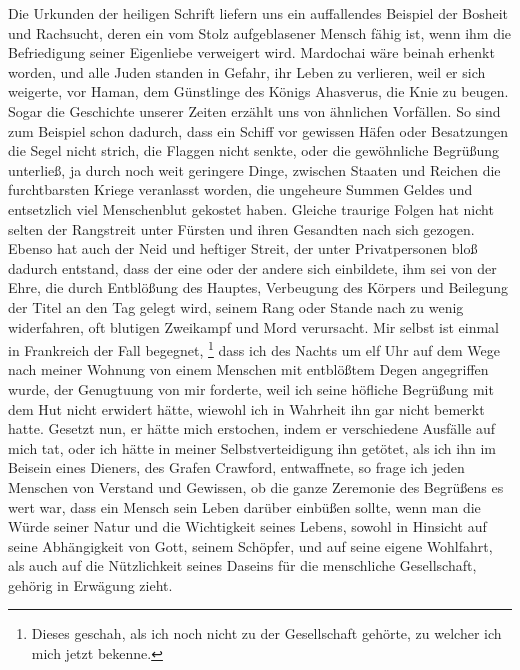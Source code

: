 Die Urkunden der heiligen Schrift liefern uns ein auffallendes Beispiel der
Bosheit und Rachsucht, deren ein vom Stolz aufgeblasener Mensch fähig ist, wenn
ihm die Befriedigung seiner Eigenliebe verweigert wird.
Mardochai wäre beinah
erhenkt worden, und alle Juden standen in Gefahr, ihr Leben zu verlieren, weil
er sich weigerte, vor Haman, dem Günstlinge des Königs
Ahasverus, die Knie zu
beugen. Sogar die Geschichte unserer Zeiten erzählt uns von
ähnlichen Vorfällen.
So sind zum Beispiel schon dadurch, dass ein Schiff vor gewissen Häfen oder Besatzungen
die Segel nicht strich, die Flaggen nicht senkte, oder die gewöhnliche
Begrüßung
unterließ, ja durch noch weit geringere Dinge, zwischen Staaten und Reichen die
furchtbarsten Kriege veranlasst worden, die ungeheure Summen Geldes
und
entsetzlich viel Menschenblut gekostet haben. Gleiche traurige Folgen hat nicht
selten der Rangstreit unter Fürsten und ihren Gesandten nach sich gezogen.
Ebenso
hat auch der Neid und heftiger Streit, der unter Privatpersonen bloß dadurch
entstand, dass der eine oder der andere sich einbildete, ihm sei von der Ehre,
die durch Entblößung des Hauptes,
Verbeugung des Körpers und Beilegung der Titel
an den Tag gelegt wird, seinem Rang oder Stande nach zu wenig widerfahren, oft
blutigen Zweikampf und Mord verursacht. Mir selbst ist einmal
in Frankreich
der Fall begegnet, \label{kap9_ab2_duell_penn}\footnote{Dieses geschah, als ich
noch nicht zu der
Gesellschaft gehörte, zu welcher ich mich jetzt bekenne.}
 dass ich des Nachts um
elf Uhr auf dem Wege nach meiner Wohnung von einem Menschen mit entblößtem Degen
angegriffen wurde, der Genugtuung von mir forderte, weil ich
seine höfliche
Begrüßung mit dem Hut nicht erwidert hätte, wiewohl ich in
Wahrheit ihn gar
nicht bemerkt hatte. Gesetzt nun, er hätte mich erstochen, indem er verschiedene
Ausfälle auf mich tat, oder ich hätte in meiner Selbstverteidigung ihn
getötet, als ich ihn im Beisein eines Dieners, des Grafen
Crawford,
entwaffnete, so frage ich jeden Menschen von Verstand und Gewissen, ob die ganze
Zeremonie des Begrüßens es wert war, dass ein Mensch sein Leben darüber einbüßen
sollte, wenn man die Würde seiner Natur und die Wichtigkeit seines Lebens,
sowohl in Hinsicht auf seine Abhängigkeit von Gott, seinem Schöpfer, und auf
seine eigene Wohlfahrt, als auch auf die Nützlichkeit seines Daseins für die
menschliche Gesellschaft, gehörig in Erwägung zieht.

